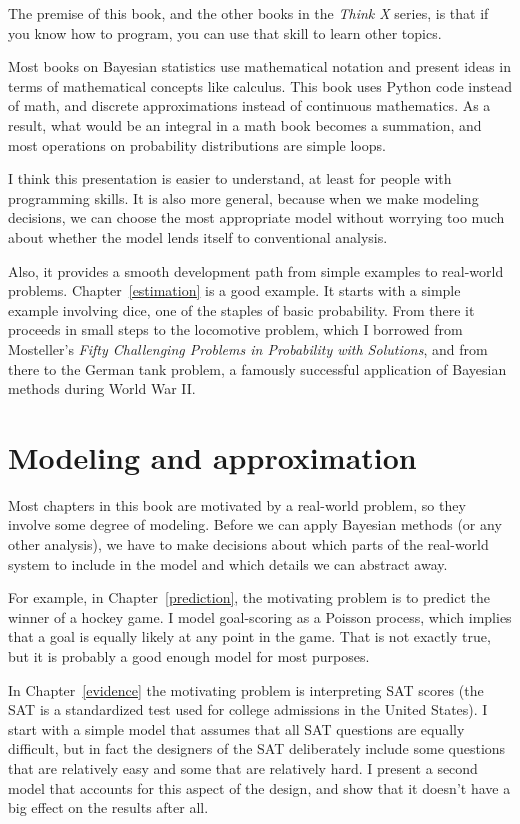\documentclass[12pt]{book}
\begin{document}
The premise of this book, and the other books in the {\it Think X}
series, is that if you know how to program, you
can use that skill to learn other topics.

Most books on Bayesian statistics use mathematical notation and
present ideas in terms of mathematical concepts like calculus.
This book uses Python code instead of math, and discrete approximations
instead of continuous mathematics.  As a result, what would
be an integral in a math book becomes a summation, and
most operations on probability distributions are simple loops.

I think this presentation is easier to understand, at least for people with
programming skills.  It is also more general, because when we make
modeling decisions, we can choose the most appropriate model without
worrying too much about whether the model lends itself to conventional
analysis.

Also, it provides a smooth development path from simple examples to
real-world problems.  Chapter~\ref{estimation} is a good example.  It
starts with a simple example involving dice, one of the staples of
basic probability.  From there it proceeds in small steps to the
locomotive problem, which I borrowed from Mosteller's {\it
  Fifty Challenging Problems in Probability with Solutions}, and from
there to the German tank problem, a famously successful application of
Bayesian methods during World War II.


\section{Modeling and approximation}

Most chapters in this book are motivated by a real-world problem, so
they involve some degree of modeling.  Before we can apply Bayesian
methods (or any other analysis), we have to make decisions about which
parts of the real-world system to include in the model and which
details we can abstract away.  

For example, in Chapter~\ref{prediction}, the motivating problem is to
predict the winner of a hockey game.  I model goal-scoring as a
Poisson process, which implies that a goal is equally likely at any
point in the game.  That is not exactly true, but it is probably a
good enough model for most purposes.

In Chapter~\ref{evidence} the motivating problem is interpreting SAT
scores (the SAT is a standardized test used for college admissions in
the United States).  I start with a simple model that assumes that all
SAT questions are equally difficult, but in fact the designers of the
SAT deliberately include some questions that are relatively easy and
some that are relatively hard.  I present a second model that accounts
for this aspect of the design, and show that it doesn't have a big
effect on the results after all.
\end{document}
